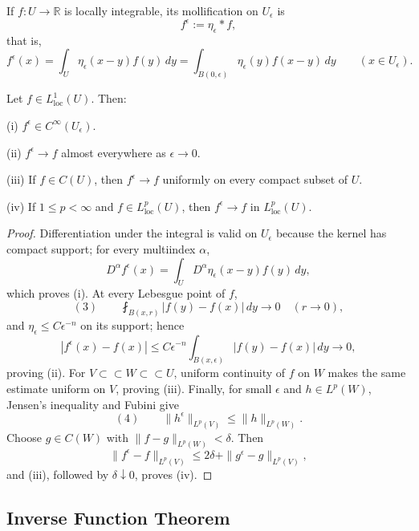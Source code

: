 \begin{definition}[Mollification]
\label{def:mollification}

If $f:U\to\mathbb R$ is locally integrable, its mollification on $U_\epsilon$ is
\[
f^\epsilon:=\eta_\epsilon*f,
\]
that is,
\[
f^\epsilon(x)
=\int_U\eta_\epsilon(x-y)f(y)\,dy
=\int_{B(0,\epsilon)}\eta_\epsilon(y)f(x-y)\,dy
\qquad(x\in U_\epsilon).
\]
\end{definition}

\begin{theorem}
\label{thm:properties-of-mollifiers}

Let $f\in L^1_{\mathrm{loc}}(U)$. Then:

(i) $f^\epsilon\in C^\infty(U_\epsilon)$.

(ii) $f^\epsilon\to f$ almost everywhere as $\epsilon\to0$.

(iii) If $f\in C(U)$, then $f^\epsilon\to f$ uniformly on every compact subset of $U$.

(iv) If $1\leq p<\infty$ and $f\in L^p_{\mathrm{loc}}(U)$, then $f^\epsilon\to f$ in $L^p_{\mathrm{loc}}(U)$.
\end{theorem}
\begin{proof}
\sketch Differentiation under the integral is valid on $U_\epsilon$ because the kernel has compact support; for every multiindex $\alpha$,
\[
D^\alpha f^\epsilon(x)
=\int_UD^\alpha\eta_\epsilon(x-y)f(y)\,dy,
\]
which proves (i). At every Lebesgue point of $f$,
\[
(3)\qquad
\fint_{B(x,r)}|f(y)-f(x)|\,dy\longrightarrow0
\quad(r\to0),
\]
and $\eta_\epsilon\leq C\epsilon^{-n}$ on its support; hence
\[
|f^\epsilon(x)-f(x)|
\leq C\epsilon^{-n}
\int_{B(x,\epsilon)}|f(y)-f(x)|\,dy\longrightarrow0,
\]
proving (ii). For $V\subset\subset W\subset\subset U$, uniform continuity of $f$ on $W$ makes the same estimate uniform on $V$, proving (iii). Finally, for small $\epsilon$ and $h\in L^p(W)$, Jensen's inequality and Fubini give
\[
(4)\qquad
\|h^\epsilon\|_{L^p(V)}\leq\|h\|_{L^p(W)}.
\]
Choose $g\in C(W)$ with $\|f-g\|_{L^p(W)}<\delta$. Then
\[
\|f^\epsilon-f\|_{L^p(V)}
\leq2\delta+\|g^\epsilon-g\|_{L^p(V)},
\]
and (iii), followed by $\delta\downarrow0$, proves (iv).
\end{proof}

\subsection{Inverse Function Theorem}

